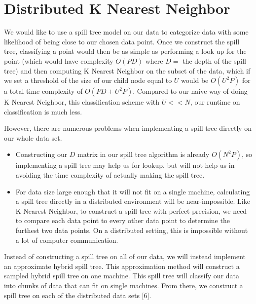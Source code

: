 \section{Distributed K Nearest Neighbor}

\vspace{5 mm}
\noindent
We would like to use a spill tree model on our data to categorize data with 
some likelihood of being close to our chosen data point. Once we 
construct the spill tree, classifying a point would then be as simple as 
performing a look up for the point (which would have complexity $O(P D)$ where 
$D = $ the depth of the spill tree) and then computing K Nearest Neighbor on 
the subset of the data, which if we set a threshold of the size of our child 
node equal to $U$ would be $O(U^{2} P)$ for a total time complexity of 
$O(P D + U^{2} P)$. Compared to our naive way of doing K Nearest Neighbor, 
this classification scheme with $U << N$, our runtime on classification is much 
less.

\vspace{5 mm}
\noindent
However, there are numerous problems when implementing a spill tree directly 
on our whole data set.

\begin{itemize}
\item Constructing our $D$ matrix in our spill tree algorithm is already  
$O(N^{2} P)$, so implementing a spill tree may help us for lookup, but will not 
help us in avoiding the time complexity of actually making the spill tree.
\item For data size large enough that it will not fit on a single machine, 
calculating a spill tree directly in a distributed environment will be 
near-impossible. Like K Nearest Neighbor, to construct a spill tree with 
perfect precision, we need to compare each data point to every other data 
point to determine the furthest two data points. On a distributed setting, this 
is impossible without a lot of computer communication.
\end{itemize}

\vspace{5 mm}
\noindent
Instead of constructing a spill tree on all of our data, we will instead 
implement an approximate hybrid spill tree. This approximation method will 
construct a sampled hybrid spill tree on one machine. This spill tree will 
classify our data into chunks of data that can fit on single machines. From 
there, we construct a spill tree on each of the distributed data sets [6].

